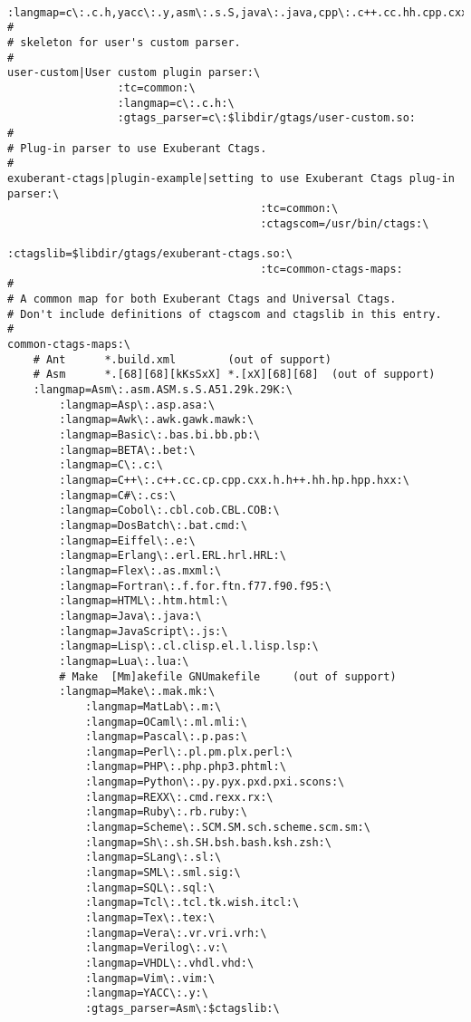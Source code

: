 \documentclass[11pt]{article}
\begin{document}
\begin{lstlisting}
    :langmap=c\:.c.h,yacc\:.y,asm\:.s.S,java\:.java,cpp\:.c++.cc.hh.cpp.cxx.hxx.hpp.C.H,php\:.php.php3.phtml:
#
# skeleton for user's custom parser.
#
user-custom|User custom plugin parser:\
                 :tc=common:\
                 :langmap=c\:.c.h:\
                 :gtags_parser=c\:$libdir/gtags/user-custom.so:
#
# Plug-in parser to use Exuberant Ctags.
#
exuberant-ctags|plugin-example|setting to use Exuberant Ctags plug-in parser:\
                                       :tc=common:\
                                       :ctagscom=/usr/bin/ctags:\
                                       :ctagslib=$libdir/gtags/exuberant-ctags.so:\
                                       :tc=common-ctags-maps:
#
# A common map for both Exuberant Ctags and Universal Ctags.
# Don't include definitions of ctagscom and ctagslib in this entry.
#
common-ctags-maps:\
    # Ant      *.build.xml        (out of support)
    # Asm      *.[68][68][kKsSxX] *.[xX][68][68]  (out of support)
    :langmap=Asm\:.asm.ASM.s.S.A51.29k.29K:\
        :langmap=Asp\:.asp.asa:\
        :langmap=Awk\:.awk.gawk.mawk:\
        :langmap=Basic\:.bas.bi.bb.pb:\
        :langmap=BETA\:.bet:\
        :langmap=C\:.c:\
        :langmap=C++\:.c++.cc.cp.cpp.cxx.h.h++.hh.hp.hpp.hxx:\
        :langmap=C#\:.cs:\
        :langmap=Cobol\:.cbl.cob.CBL.COB:\
        :langmap=DosBatch\:.bat.cmd:\
        :langmap=Eiffel\:.e:\
        :langmap=Erlang\:.erl.ERL.hrl.HRL:\
        :langmap=Flex\:.as.mxml:\
        :langmap=Fortran\:.f.for.ftn.f77.f90.f95:\
        :langmap=HTML\:.htm.html:\
        :langmap=Java\:.java:\
        :langmap=JavaScript\:.js:\
        :langmap=Lisp\:.cl.clisp.el.l.lisp.lsp:\
        :langmap=Lua\:.lua:\
        # Make  [Mm]akefile GNUmakefile     (out of support)
        :langmap=Make\:.mak.mk:\
            :langmap=MatLab\:.m:\
            :langmap=OCaml\:.ml.mli:\
            :langmap=Pascal\:.p.pas:\
            :langmap=Perl\:.pl.pm.plx.perl:\
            :langmap=PHP\:.php.php3.phtml:\
            :langmap=Python\:.py.pyx.pxd.pxi.scons:\
            :langmap=REXX\:.cmd.rexx.rx:\
            :langmap=Ruby\:.rb.ruby:\
            :langmap=Scheme\:.SCM.SM.sch.scheme.scm.sm:\
            :langmap=Sh\:.sh.SH.bsh.bash.ksh.zsh:\
            :langmap=SLang\:.sl:\
            :langmap=SML\:.sml.sig:\
            :langmap=SQL\:.sql:\
            :langmap=Tcl\:.tcl.tk.wish.itcl:\
            :langmap=Tex\:.tex:\
            :langmap=Vera\:.vr.vri.vrh:\
            :langmap=Verilog\:.v:\
            :langmap=VHDL\:.vhdl.vhd:\
            :langmap=Vim\:.vim:\
            :langmap=YACC\:.y:\
            :gtags_parser=Asm\:$ctagslib:\

\end{lstlisting}
\end{document}
